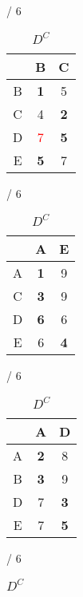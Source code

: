 \documentclass[a4paper, 11 pt, article, accentcolor=tud7b]{tudreport}
\begin{document}
	\begin{table}[h]
	  \begin{subtable}[b]{\textwidth / 6}
	    \begin{tabular}{| c | c | c |}
	      \hline
	        & B                   & C          \\ \hline
	      B & \textbf{1}          & 5          \\ \hline
	      C & 4                   & \textbf{2} \\ \hline
	      D & \textcolor{red}{7}  & \textbf{5} \\ \hline
	      E & \textbf{5}          & 7          \\ \hline
	    \end{tabular}
	    \caption{$D^{A}$}
	  \end{subtable}
	  \hfill
	  \begin{subtable}[b]{\textwidth / 6}
	    \begin{tabular}{| c | c | c |}
	    \hline
	      & A                   & E                  \\ \hline
	    A & \textbf{1}          & 9                  \\ \hline
	    C & \textbf{3}          & 9                  \\ \hline
	    D & \textbf{6}          & 6                  \\ \hline
	    E & 6                   & \textbf{4}         \\ \hline
	    \end{tabular}
	    \caption{$D^{B}$}
	  \end{subtable}
	  \hfill
	  \begin{subtable}[b]{\textwidth / 6}
	    \begin{tabular}{| c | c | c |}
	    \hline
	      & A                   & D                  \\ \hline
	    A & \textbf{2}          & 8                  \\ \hline
	    B & \textbf{3}          & 9                  \\ \hline
	    D & 7                   & \textbf{3}         \\ \hline
	    E & 7                   & \textbf{5}         \\ \hline
	    \end{tabular}
	    \caption{$D^{C}$}
	  \end{subtable}
    \hfill
	  \begin{subtable}[b]{\textwidth / 6}
	    \begin{tabular}{| c | c | c |}

\end{tabular}
\end{subtable}
\end{table}
\end{document}
